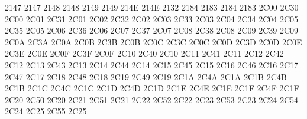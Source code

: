  2147 2147 %
 2148 2148 %
 2149 2149 %
\setcclcuc 214E 214E 2132 %
 2184 2183 %
 2184 2183 %
\setcclcuc 2C00 2C30 2C00 %
\setcclcuc 2C01 2C31 2C01 %
\setcclcuc 2C02 2C32 2C02 %
\setcclcuc 2C03 2C33 2C03 %
\setcclcuc 2C04 2C34 2C04 %
\setcclcuc 2C05 2C35 2C05 %
\setcclcuc 2C06 2C36 2C06 %
\setcclcuc 2C07 2C37 2C07 %
\setcclcuc 2C08 2C38 2C08 %
\setcclcuc 2C09 2C39 2C09 %
\setcclcuc 2C0A 2C3A 2C0A %
\setcclcuc 2C0B 2C3B 2C0B %
\setcclcuc 2C0C 2C3C 2C0C %
\setcclcuc 2C0D 2C3D 2C0D %
\setcclcuc 2C0E 2C3E 2C0E %
\setcclcuc 2C0F 2C3F 2C0F %
\setcclcuc 2C10 2C40 2C10 %
\setcclcuc 2C11 2C41 2C11 %
\setcclcuc 2C12 2C42 2C12 %
\setcclcuc 2C13 2C43 2C13 %
\setcclcuc 2C14 2C44 2C14 %
\setcclcuc 2C15 2C45 2C15 %
\setcclcuc 2C16 2C46 2C16 %
\setcclcuc 2C17 2C47 2C17 %
\setcclcuc 2C18 2C48 2C18 %
\setcclcuc 2C19 2C49 2C19 %
\setcclcuc 2C1A 2C4A 2C1A %
\setcclcuc 2C1B 2C4B 2C1B %
\setcclcuc 2C1C 2C4C 2C1C %
\setcclcuc 2C1D 2C4D 2C1D %
\setcclcuc 2C1E 2C4E 2C1E %
\setcclcuc 2C1F 2C4F 2C1F %
\setcclcuc 2C20 2C50 2C20 %
\setcclcuc 2C21 2C51 2C21 %
\setcclcuc 2C22 2C52 2C22 %
\setcclcuc 2C23 2C53 2C23 %
\setcclcuc 2C24 2C54 2C24 %
\setcclcuc 2C25 2C55 2C25 %
